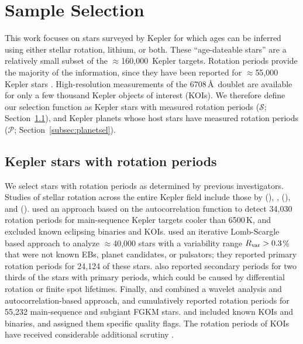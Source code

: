 \documentclass[11pt,twocolumn,tighten]{aastex63}
\newcommand{\nkeplerstars}{$\approx$160{,}000}
\begin{document}
\section{Sample Selection}
\label{sec:selection}

This work focuses on stars surveyed by Kepler for which ages can be
inferred using either stellar rotation, lithium, or both.  These
``age-dateable stars'' are a relatively small subset of the
\nkeplerstars\ Kepler targets.  Rotation periods provide the majority
of the information, since they have been reported for
$\approx$55{,}000 Kepler stars
\citep[e.g.][]{McQuillan_2014,Santos_2021}.  
High-resolution measurements of the  6708\,\AA\ doublet are
available for only a few thousand Kepler objects of interest (KOIs).
We therefore define our selection function as Kepler stars
with measured rotation periods ($\mathcal{S}$;
Section~\ref{subsec:starsel}), and Kepler planets whose host stars
have measured rotation periods ($\mathcal{P}$;
Section~\ref{subsec:planetsel}).


\subsection{Kepler stars with rotation periods}
\label{subsec:starsel}

We select stars with rotation periods as determined by previous
investigators.  Studies of stellar rotation across the entire Kepler field
include those by \citet{McQuillan_2014} (),
\citet{Reinhold_2015},
\citet{Santos_2019} (), and
\citet{Santos_2021} ().
 used an approach
based on the autocorrelation function to detect 34{,}030 rotation
periods for main-sequence Kepler targets cooler than 6500\,K, and excluded
known eclipsing binaries and KOIs.  
\citet{Reinhold_2015} used an iterative Lomb-Scargle based approach to
analyze $\approx$40{,}000 stars with a variability range $R_{\rm
	var}>0.3$\% that were not known EBs, planet candidates, or
  pulsators;
they reported primary rotation periods for 24{,}124 of these stars.
\citet{Reinhold_2015} also reported secondary periods for two thirds
of the stars with primary periods, which could be caused by
differential rotation or finite spot lifetimes.  
Finally,
 and
 combined a wavelet analysis and
autocorrelation-based approach, and cumulatively reported rotation
periods for 55{,}232 main-sequence and subgiant FGKM stars.
 and  included known
KOIs and binaries, and assigned them specific quality flags.  
The rotation periods of KOIs have received considerable additional
scrutiny
\citep[e.g.][]{Walkowicz_2013,Mazeh_2015,Angus_2018,David_2021}.
\end{document}
